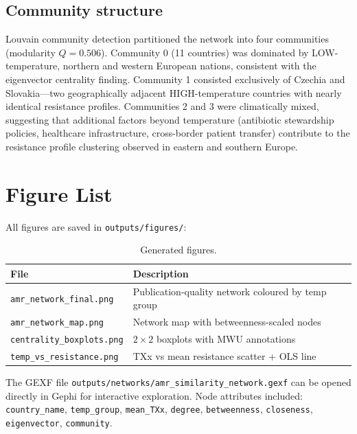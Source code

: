 \documentclass[12pt,a4paper]{article}
\begin{document}
\subsection*{Community structure}

Louvain community detection partitioned the network into four
communities (modularity $Q = 0.506$).
Community 0 (11 countries) was dominated by LOW-temperature,
northern and western European nations, consistent with the eigenvector
centrality finding.
Community 1 consisted exclusively of Czechia and Slovakia---two
geographically adjacent HIGH-temperature countries with nearly identical
resistance profiles.
Communities 2 and 3 were climatically mixed, suggesting that additional
factors beyond temperature (antibiotic stewardship policies, healthcare
infrastructure, cross-border patient transfer) contribute to the
resistance profile clustering observed in eastern and southern Europe.

\section{Figure List}

All figures are saved in \texttt{outputs/figures/}:

\begin{table}[h]
\centering
\caption{Generated figures.}
\begin{tabular}{@{}ll@{}}
\toprule
File & Description \\
\midrule
\texttt{amr\_network\_final.png} & Publication-quality network coloured by temp group \\
\texttt{amr\_network\_map.png}   & Network map with betweenness-scaled nodes \\
\texttt{centrality\_boxplots.png} & $2 \times 2$ boxplots with MWU annotations \\
\texttt{temp\_vs\_resistance.png} & TXx vs mean resistance scatter + OLS line \\
\bottomrule
\end{tabular}
\end{table}

The GEXF file \texttt{outputs/networks/amr\_similarity\_network.gexf}
can be opened directly in Gephi for interactive exploration.
Node attributes included: \texttt{country\_name}, \texttt{temp\_group},
\texttt{mean\_TXx}, \texttt{degree}, \texttt{betweenness},
\texttt{closeness}, \texttt{eigenvector}, \texttt{community}.
\end{document}
